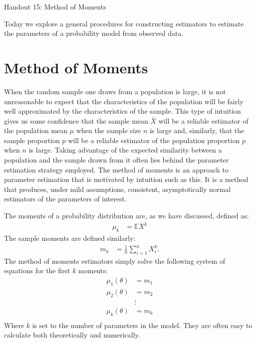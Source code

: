 \documentclass{tufte-handout}
\begin{document}
\justify

{\LARGE Handout 15: Method of Moments}

\vspace*{18pt}

\noindent

Today we explore a general procedures for constructing estimators
to estimate the parameters of a probability model from observed
data.

\section*{Method of Moments}

When the random sample one draws from a population is large, it is not
unreasonable to expect that the characteristics of the population will
be fairly well approximated by the characteristics of the sample. This
type of intuition gives us some confidence that the sample mean
$\bar{X}$
will be a reliable estimator of the population mean $\mu$ when the
sample size $n$ is large and, similarly, that the sample proportion
$p$ will be a reliable estimator of the population proportion
$p$ when $n$ is large. Taking advantage of the expected
similarity between a population and the sample drawn from it often lies
behind the parameter estimation strategy employed. The method of moments
is an approach to parameter estimation that is motivated by intuition
such as this. It is a method that produces, under
mild assumptions, consistent, asymptotically normal estimators of the
parameters of interest.

The moments of a probability distribution are, as we have discussed,
defined as:
\begin{align*}
\mu_k &= \mathbb{E} X^k
\end{align*}
The sample moments are defined similarly:
\begin{align*}
m_k &= \frac{1}{n} \sum_{i=1}^n X_i^k.
\end{align*}
The method of moments estimators simply solve the following system
of equations for the first $k$ moments:
\begin{align*}
\mu_1(\theta) &= m_1 \\
\mu_2(\theta) &= m_2 \\
&\vdots \\
\mu_k(\theta) &= m_k \\
\end{align*}
Where $k$ is set to the number of parameters in the model. They are often
easy to calculate both theoretically and numerically.
\end{document}
